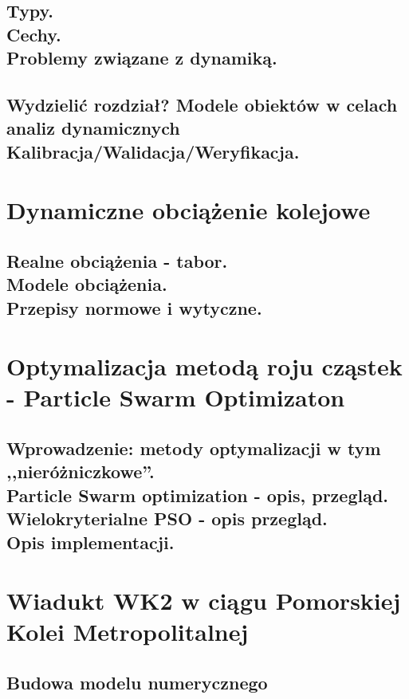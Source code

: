 	\section{Typy.\\Cechy.\\Problemy związane z dynamiką.}
	\section{\textbf{Wydzielić rozdział?} Modele obiektów w celach analiz dynamicznych\\Kalibracja/Walidacja/Weryfikacja.}
\chapter{Dynamiczne obciążenie kolejowe}
	\section{Realne obciążenia - tabor.\\Modele obciążenia.\\Przepisy normowe i wytyczne.}
	
	
	
	
	
	

\chapter{Optymalizacja metodą roju cząstek - Particle Swarm Optimizaton}
	\section{Wprowadzenie: metody optymalizacji w tym ,,nieróżniczkowe''.\\Particle Swarm optimization - opis, przegląd.\\Wielokryterialne PSO - opis przegląd.\\Opis implementacji.}
\chapter{Wiadukt WK2 w ciągu Pomorskiej Kolei Metropolitalnej}
	\section{Budowa modelu numerycznego}
